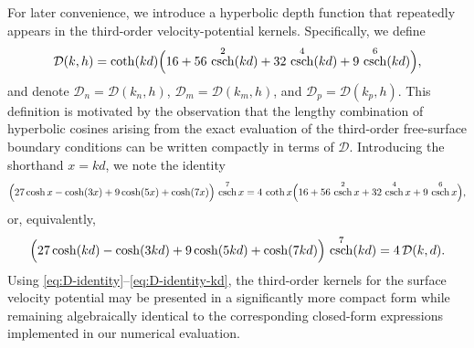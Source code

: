 \documentclass[lineno]{JFM-FLM_Au}
\DeclareMathOperator{\csch}{csch}
\begin{document}
\begin{appen}
For later convenience, we introduce a hyperbolic depth function that repeatedly appears in the third-order
velocity-potential kernels. Specifically, we define
\begin{equation}
  \mathcal{D}(k,h)
  = \coth(kd)\Bigl(16 + 56\,\csch^{2}(kd) + 32\,\csch^{4}(kd) + 9\,\csch^{6}(kd)\Bigr),
\end{equation}
and denote $\mathcal{D}_n=\mathcal{D}(k_n,h)$, $\mathcal{D}_m=\mathcal{D}(k_m,h)$, and $\mathcal{D}_p=\mathcal{D}(k_p,h)$.
This definition is motivated by the observation that the lengthy combination of hyperbolic cosines arising from the
exact evaluation of the third-order free-surface boundary conditions can be written compactly in terms of
$\mathcal{D}$. Introducing the shorthand $x=kd$, we note the identity
\begin{equation}
\label{eq:D-identity}
\Bigl(27\cosh x-\cosh(3x)+9\cosh(5x)+\cosh(7x)\Bigr)\,\csch^{7}x
=
4\,\coth x\Bigl(16+56\,\csch^{2}x+32\,\csch^{4}x+9\,\csch^{6}x\Bigr),
\end{equation}
or, equivalently,
\begin{equation}
\label{eq:D-identity-kd}
\Bigl(27\cosh(kd)-\cosh(3kd)+9\cosh(5kd)+\cosh(7kd)\Bigr)\,\csch^{7}(kd)
= 4\,\mathcal{D}(k,d).
\end{equation}
Using \eqref{eq:D-identity}--\eqref{eq:D-identity-kd}, the third-order kernels for the surface velocity potential may be
presented in a significantly more compact form while remaining algebraically identical to the corresponding closed-form
expressions implemented in our numerical evaluation.


\end{appen}
\end{document}
